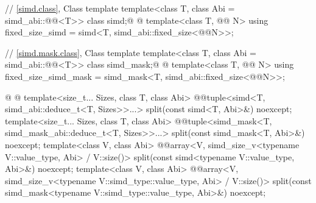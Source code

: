 \begin{codeblock}
{  // \ref{simd.class}, Class template 
  template<class T, class Abi = simd_abi::@@<T>> class simd;@
  @
  template<class T, @@ N> using fixed_size_simd = simd<T, simd_abi::fixed_size<@@N>>;

  // \ref{simd.mask.class}, Class template 
  template<class T, class Abi = simd_abi::@@<T>> class simd_mask;@
  @
  template<class T, @@ N> using fixed_size_simd_mask = simd_mask<T, simd_abi::fixed_size<@@N>>;

  @%
@
  template<size_t... Sizes, class T, class Abi>
    @@tuple<simd<T, simd_abi::deduce_t<T, Sizes>>...>
      split(const simd<T, Abi>&) noexcept;
  template<size_t... Sizes, class T, class Abi>
    @@tuple<simd_mask<T, simd_mask_abi::deduce_t<T, Sizes>>...>
      split(const simd_mask<T, Abi>&) noexcept;
  template<class V, class Abi>
    @@array<V, simd_size_v<typename V::value_type, Abi> / V::size()>
      split(const simd<typename V::value_type, Abi>&) noexcept;
  template<class V, class Abi>
    @@array<V, simd_size_v<typename V::simd_type::value_type, Abi> / V::size()>
      split(const simd_mask<typename V::simd_type::value_type, Abi>&) noexcept;

}
\end{codeblock}
